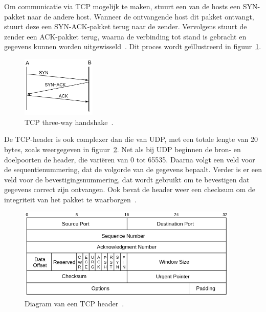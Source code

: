 Om communicatie via TCP mogelijk te maken, stuurt een van de hosts een SYN-pakket naar de andere host.
Wanneer de ontvangende host dit pakket ontvangt, stuurt deze een SYN-ACK-pakket terug naar de zender.
Vervolgens stuurt de zender een ACK-pakket terug, waarna de verbinding tot stand is gebracht en gegevens kunnen worden uitgewisseld~\autocite{hypponen2021securing}.
Dit proces wordt geïllustreerd in figuur~\ref{fig:netwerk-tcp-handshake}.

\begin{figure}[h!]
    \begin{center}
        \includegraphics[width=100pt]
        {./graphics/network/tcp-handshake.png}
        \caption{\label{fig:netwerk-tcp-handshake}TCP three-way handshake~\autocite{dordal2020}.}
    \end{center}
\end{figure}

De TCP-header is ook complexer dan die van UDP, met een totale lengte van 20 bytes, zoals weergegeven in figuur~\ref{fig:netwerk-tcp-header}.
Net als bij UDP beginnen de bron- en doelpoorten de header, die vari\"eren van 0 tot 65535.
Daarna volgt een veld voor de sequentienummering, dat de volgorde van de gegevens bepaalt.
Verder is er een veld voor de bevestigingsnummering, dat wordt gebruikt om te bevestigen dat gegevens correct zijn ontvangen.
Ook bevat de header weer een checksum om de integriteit van het pakket te waarborgen~\autocite{dordal2020}.

\begin{figure}[h!]
    \begin{center}
        \includegraphics[width=300pt]
        {./graphics/network/tcp-header.png}
        \caption{\label{fig:netwerk-tcp-header}Diagram van een TCP header~\autocite{dordal2020}.}
    \end{center}
\end{figure}

